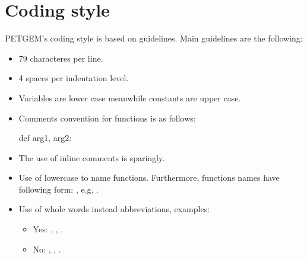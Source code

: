 \documentclass[letterpaper,10pt,english]{sphinxmanual}
\begin{document}
\section{Coding style}
\label{\detokenize{Manual:coding-style}}\label{\detokenize{Manual:id3}}
PETGEM’s coding style is based on
 guidelines. Main
guidelines are the following:
\begin{itemize}
\item {} 
79 characteres per line.

\item {} 
4 spaces per indentation level.

\item {} 
Variables are lower case meanwhile constants are upper case.

\item {} 
Comments convention for functions is as follows:

\begin{sphinxVerbatim}[commandchars=\\\{\}]
def arg1, arg2:

\end{sphinxVerbatim}

\item {} 
The use of inline comments is sparingly.

\item {} 
Use of lowercase to name functions. Furthermore, functions names have following form: , e.g. .

\item {} 
Use of whole words instead abbreviations, examples:
\begin{itemize}
\item {} 
Yes: , , .

\item {} 
No: , , .

\end{itemize}

\end{itemize}
\end{document}
